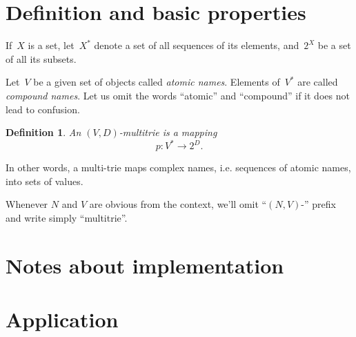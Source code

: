 \documentclass{article}
\newtheorem{Df}{Definition}
\begin{document}
\section{Definition and basic properties}

If~$X$ is a set, let~$X^\ast$ denote a set of all sequences of its elements,
and~$2^X$ be a set of all its subsets.

Let~$V$ be a given set of objects called \emph{atomic names}. Elements
of~$V^\ast$ are called \emph{compound names}. Let us omit the words ``atomic''
and ``compound'' if it does not lead to confusion.

\begin{Df}
An \emph{$(V,D)$-multitrie} is a mapping
\[
  p : V^\ast \to 2^D .
\]
\end{Df}

In other words, a multi-trie maps complex names, i.e. sequences of
atomic names, into sets of values.

Whenever $N$ and $V$ are obvious from the context, we'll omit ``$(N,V)$-''
prefix and write simply ``multitrie''.

\section{Notes about implementation}

\section{Application}
\end{document}
